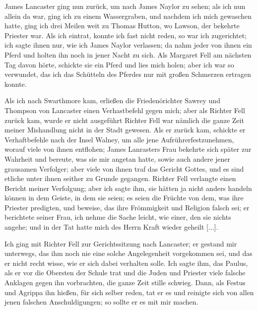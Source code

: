 James Lancaster
ging nun zurück, um nach James Naylor zu sehen; als ich nun
allein da war, ging ich zu einem Wassergraben, und nachdem ich
mich gewaschen hatte, ging ich drei Meilen weit zu Thomas
Hutton, wo Lawson, 
der bekehrte Priester war. Als ich eintrat,
konnte ich fast nicht reden, so war ich zugerichtet; 
ich sagte ihnen nur,
wie ich James Naylor verlassen; da nahm jeder von ihnen ein
Pferd und holten ihn noch in jener Nacht zu sich. Als Margaret
Fell am nächsten Tag davon hörte, 
schickte sie ein Pferd und lies
mich holen; aber ich war so verwundet, das ich das Schütteln
des Pferdes nur mit großen Schmerzen ertragen konnte. 

Als ich
nach Swarthmore kam, erließen die Friedenörichter Sawrey und
Thompson von Lancaster einen Verhastbefehl gegen mich; aber
als Richter Fell zurück kam, wurde er nicht ausgeführt Richter
Fell war nämlich die ganze Zeit meiner Mishandlung nicht in
der Stadt gewesen. Als er zurück kam, schickte er Verhaftbefehle
nach der Insel Walney, um alle jene Aufrührerfestzunehmen,
worauf viele von ihnen entflohen; James Lanrasters Frau 
bekehrte sich später zur Wahrheit und bereute, was sie mir 
angetan hatte, sowie auch andere jener grausamen Verfolger; aber
viele von ihnen traf das Gericht Gottes, 
und es sind etliche unter
ihnen seither zu Grunde gegangen. Richter Fell verlangte einen
Bericht meiner Verfolgung; aber ich sagte ihm, sie hätten ja nicht
anders handeln können in dem Geiste, in dem sie seien; es seien
die Früchte von dem, was ihre Priester predigten, und beweise,
das ihre Frömmigkeit und Religion falsch sei; er berichtete seiner
Frau, ich nehme die Sache leicht, wie einer, den sie nichts angehe;
und in der Tat hatte mich des Herrn Kraft wieder geheilt [...].

Ich ging mit Richter Fell zur Gerichtssitzung 
nach Lancaster;
er gestand mir unterwegs, das ihm noch nie eine solche 
Angelegenheit vorgekommen sei, und das er nicht recht wisse, wie
er sich dabei verhalten solle. Ich sagte ihm, das Paulus, als
er vor die Obersten der Schule trat und die Juden und Priester
viele falsche Anklagen gegen ihn vorbrachten, die ganze Zeit stille
schwieg. Dann, als Festus und Agrippa ihn hießen, für sich selber
reden, tat er es und reinigte sich von allen jenen falschen 
Anschuldigungen; so sollte er es mit mir machen. 

